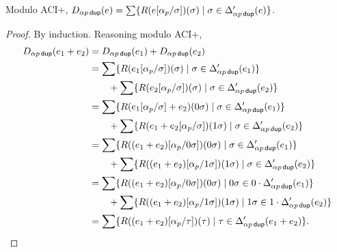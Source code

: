 \documentclass{article}
\newcommand\pdup{\mathop{\mathsf{dup}}}
\begin{document}
\begin{lemma}
\label{eq:ABDelta}
Modulo ACI+, $D_{\alpha p\pdup}(e) = \sum\set{\rep\sigma{e\subst{\alpha_p}\sigma}}{\sigma\in\Delta'_{\alpha p\pdup}(e)}$.
\end{lemma}
\begin{proof}
By induction. Reasoning modulo ACI+,
\begin{align*}
D_{\alpha p\pdup}(e_1+e_2) &= D_{\alpha p\pdup}(e_1) + D_{\alpha p\pdup}(e_2)\\
&= \sum\set{\rep\sigma{e_1\subst{\alpha_p}\sigma}}{\sigma\in\Delta'_{\alpha p\pdup}(e_1)}\\
& \qquad + \sum\set{\rep\sigma{e_2\subst{\alpha_p}\sigma}}{\sigma\in\Delta'_{\alpha p\pdup}(e_2)}\\
&= \sum\set{\rep{0\sigma}{e_1\subst{\alpha_p}\sigma+e_2}}{\sigma\in\Delta'_{\alpha p\pdup}(e_1)}\\
& \qquad + \sum\set{\rep{1\sigma}{e_1+e_2\subst{\alpha_p}\sigma}}{\sigma\in\Delta'_{\alpha p\pdup}(e_2)}\\
&= \sum\set{\rep{0\sigma}{(e_1+e_2)\subst{\alpha_p}{0\sigma}}}{\sigma\in\Delta'_{\alpha p\pdup}(e_1)}\\
& \qquad + \sum\set{\rep{1\sigma}{(e_1+e_2)\subst{\alpha_p}{1\sigma}}}{\sigma\in\Delta'_{\alpha p\pdup}(e_2)}\\
&= \sum\set{\rep{0\sigma}{(e_1+e_2)\subst{\alpha_p}{0\sigma}}}{0\sigma\in 0\cdot\Delta'_{\alpha p\pdup}(e_1)}\\
& \qquad + \sum\set{\rep{1\sigma}{(e_1+e_2)\subst{\alpha_p}{1\sigma}}}{1\sigma\in 1\cdot\Delta'_{\alpha p\pdup}(e_2)}\\
&= \sum\set{\rep{\tau}{(e_1+e_2)\subst{\alpha_p}{\tau}}}{\tau\in\Delta'_{\alpha p\pdup}(e_1+e_2)}.
\end{align*}

\end{proof}
\end{document}
